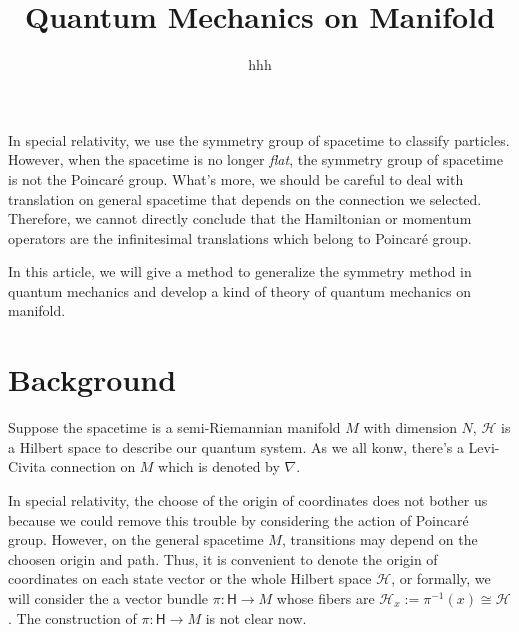 \documentclass[12pt]{article}
\title{Quantum Mechanics on Manifold}
\author{hhh}
\theoremstyle{definition}
\theoremstyle{plain}
\begin{document}
\maketitle

In special relativity, we use the symmetry group of spacetime to classify particles. However, when the spacetime is no longer \textit{flat}, the symmetry group of spacetime is not the Poincar\'e group. What's more, we should be careful to deal with translation on general spacetime that depends on the connection we selected. Therefore, we cannot directly conclude that the Hamiltonian or momentum operators are the infinitesimal translations which belong to Poincar\'e group.

In this article, we will give a method to generalize the symmetry method in quantum mechanics and develop a kind of theory of quantum mechanics on manifold.

\section{Background}

Suppose the spacetime is a semi-Riemannian manifold $M$ with dimension $N$, $\mathcal H$ is a Hilbert space to describe our quantum system. As we all konw, there's a Levi-Civita connection on $M$ which is denoted by $\nabla$.

In special relativity, the choose of the origin of coordinates does not bother us because we could remove this trouble by considering the action of Poincar\'e group. However, on the general spacetime $M$, transitions may depend on the choosen origin and path. Thus, it is convenient to denote  the origin of coordinates on each state vector or the whole Hilbert space $\mathcal H$, or formally, we will consider the a vector bundle $\pi:\mathsf H\to M$ whose fibers are $\mathcal H_x:=\pi^{-1}(x)\cong \mathcal H$. The construction of $\pi:\mathsf H\to M$ is not clear now.
\end{document}
